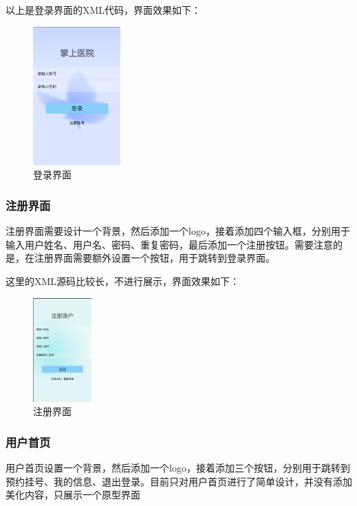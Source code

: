 \documentclass[UTF8,12pt]{article}
\begin{document}
以上是登录界面的XML代码，界面效果如下：

\begin{figure}[htbp]
    \centering
    \includegraphics[width=0.3\textwidth]{imgs/3.png}
    \caption{登录界面}
    \label{fig:login}
\end{figure}

\subsubsection{注册界面}
注册界面需要设计一个背景，然后添加一个logo，接着添加四个输入框，分别用于输入用户姓名、用户名、密码、重复密码，最后添加一个注册按钮。需要注意的是，在注册界面需要额外设置一个按钮，用于跳转到登录界面。

这里的XML源码比较长，不进行展示，界面效果如下：

\begin{figure}[htbp]
    \centering
    \includegraphics[width=0.2\textwidth]{imgs/4.png}
    \caption{注册界面}
    \label{fig:register}
\end{figure}



\subsubsection{用户首页}
用户首页设置一个背景，然后添加一个logo，接着添加三个按钮，分别用于跳转到预约挂号、我的信息、退出登录。目前只对用户首页进行了简单设计，并没有添加美化内容，只展示一个原型界面
\end{document}
